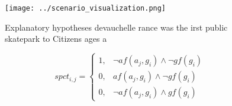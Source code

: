 \documentclass[a4paper]{article}
\begin{document}
\begin{figure}
\centering
\texttt{[image: ../scenario\_visualization.png]}
\caption{Explanatory hypotheses devauchelle rance was the irst public skatepark to Citizens ages a
}
\end{figure}
 
\begin{equation}
spct_{i,j} =
\begin{cases}
1, & \text{$\neg af(a_j,g_i) \wedge \neg gf(g_i)$}\\
0, & \text{$af(a_j,g_i) \wedge \neg gf(g_i)$}\\
0, & \text{$\neg af(a_j,g_i) \wedge gf(g_i)$}
\end{cases}
\end{equation}
\end{document}
